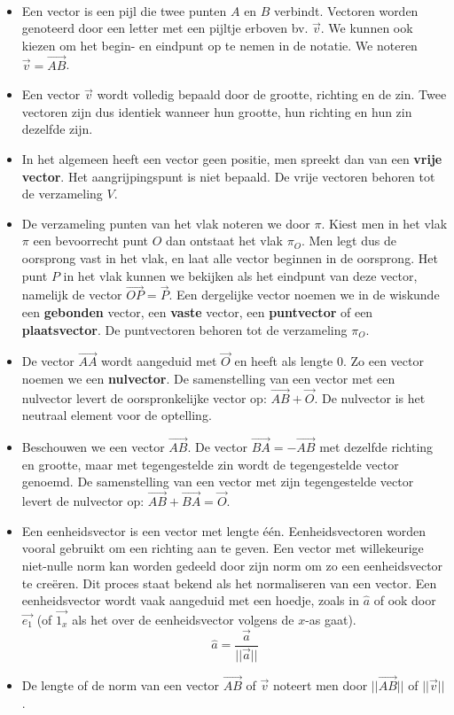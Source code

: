 \begin{opmerking}
	\ \\
\begin{itemize}
	\item Een vector is een pijl die twee punten $A$ en $B$ verbindt. Vectoren worden genoteerd door een letter met een pijltje erboven bv. $\vec{v}$. We kunnen ook kiezen om het begin- en eindpunt op te nemen in de notatie. We noteren $\vec{v}=\vec{AB}$.
	\item Een vector $\vec{v}$ wordt volledig bepaald door de grootte, richting en de zin. Twee vectoren zijn dus identiek wanneer hun grootte, hun richting en hun zin dezelfde zijn.
	\item In het algemeen heeft een vector geen positie, men spreekt dan van een \textbf{vrije vector}. Het aangrijpingspunt is niet bepaald. De vrije vectoren behoren tot de verzameling $V$.
	\item De verzameling punten van het vlak noteren we door $\pi$. Kiest men in het vlak $\pi$ een bevoorrecht punt $O$ dan ontstaat het vlak $\pi_O$. Men legt dus de oorsprong  vast in het vlak, en laat alle vector beginnen in de oorsprong. Het punt $P$ in het vlak kunnen we bekijken als het eindpunt van deze vector, namelijk de vector $\vec{OP}=\vec{P}$. Een dergelijke vector noemen we in de wiskunde een \textbf{gebonden} vector, een \textbf{vaste} vector, een \textbf{puntvector} of een \textbf{plaatsvector}. De puntvectoren behoren tot de verzameling $\pi_O$.
	\item De vector $\vec{AA}$ wordt aangeduid met $\vec{O}$ en heeft als lengte 0. Zo een vector noemen we een \textbf{nulvector}. De samenstelling van een vector met een nulvector levert de oorspronkelijke vector op: $\vec{AB}+\vec{O}$. De nulvector is het neutraal element voor de optelling.
	\item Beschouwen we een vector $\vec{AB}$. De vector $\vec{BA}=-\vec{AB}$ met dezelfde richting en grootte, maar met tegengestelde zin wordt de tegengestelde vector genoemd. De samenstelling van een vector met zijn tegengestelde vector levert de nulvector op: $\vec{AB}+\vec{BA}=\vec{O}$.
	\item Een eenheidsvector is een vector met lengte \'e\'en. Eenheidsvectoren worden vooral gebruikt om een richting aan te geven. Een vector met willekeurige niet-nulle norm kan worden gedeeld door zijn norm om zo een eenheidsvector te cre\"eren. Dit proces staat bekend als het normaliseren van een vector. Een eenheidsvector wordt vaak aangeduid met een hoedje, zoals in $\hat{a}$  of ook door $\vec{e_1}$ (of $\vec{1_x}$ als het over de eenheidsvector volgens de $x$-as gaat).
	\begin{equation*}
	\hat{a} = \frac{\vec{a}}{||\vec{a}||}
	\end{equation*}
	\item De lengte of de norm van een vector $\vec{AB}$ of $\vec{v}$ noteert men door $||\vec{AB}||$ of $||\vec{v}||$.
\end{itemize}	
\end{opmerking}

